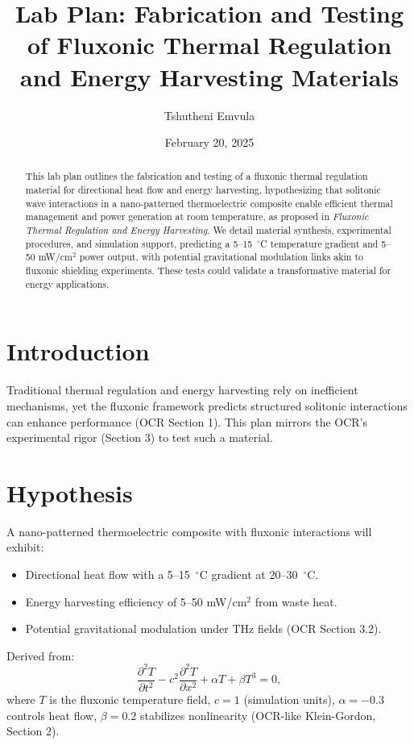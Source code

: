 \documentclass[a4paper,12pt]{article}
\title{Lab Plan: Fabrication and Testing of Fluxonic Thermal Regulation and Energy Harvesting Materials}
\author{Tshutheni Emvula}
\date{February 20, 2025}
\begin{document}
\maketitle

\begin{abstract}
This lab plan outlines the fabrication and testing of a fluxonic thermal regulation material for directional heat flow and energy harvesting, hypothesizing that solitonic wave interactions in a nano-patterned thermoelectric composite enable efficient thermal management and power generation at room temperature, as proposed in \emph{Fluxonic Thermal Regulation and Energy Harvesting}. We detail material synthesis, experimental procedures, and simulation support, predicting a 5--15~$^\circ$C temperature gradient and 5--50 mW/cm$^2$ power output, with potential gravitational modulation links akin to fluxonic shielding experiments. These tests could validate a transformative material for energy applications.
\end{abstract}

\section{Introduction}
Traditional thermal regulation and energy harvesting rely on inefficient mechanisms, yet the fluxonic framework predicts structured solitonic interactions can enhance performance (OCR Section 1). This plan mirrors the OCR’s experimental rigor (Section 3) to test such a material.

\section{Hypothesis}
A nano-patterned thermoelectric composite with fluxonic interactions will exhibit:
\begin{itemize}
    \item Directional heat flow with a 5--15~$^\circ$C gradient at 20--30~$^\circ$C.
    \item Energy harvesting efficiency of 5--50 mW/cm$^2$ from waste heat.
    \item Potential gravitational modulation under THz fields (OCR Section 3.2).
\end{itemize}
Derived from:
\begin{equation}
\frac{\partial^2 T}{\partial t^2} - c^2 \frac{\partial^2 T}{\partial x^2} + \alpha T + \beta T^3 = 0,
\end{equation}
where \(T\) is the fluxonic temperature field, \(c = 1\) (simulation units), \(\alpha = -0.3\) controls heat flow, \(\beta = 0.2\) stabilizes nonlinearity (OCR-like Klein-Gordon, Section 2).
\end{document}

